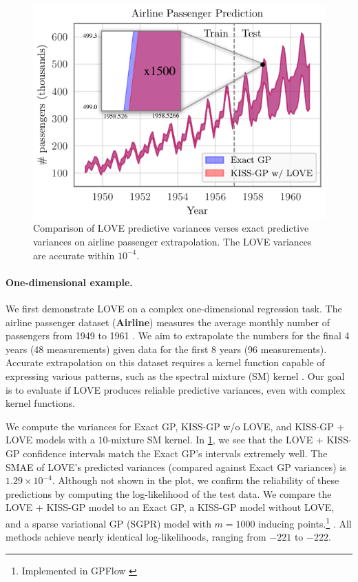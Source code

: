 \begin{figure}[t!]
  \centering
  \includegraphics[width=0.70\columnwidth]{figures/airline_comparison.pdf}
  \caption[Comparison of LOVE predictive variances verses exact predictive variances on airline passenger extrapolation.]{
    Comparison of LOVE predictive variances verses exact predictive variances on airline passenger extrapolation.
    The LOVE{} variances are accurate within $10^{-4}$.
    \label{fig:airline_results}
  }
\end{figure}

\paragraph{One-dimensional example.}
We first demonstrate LOVE{} on a complex one-dimensional regression task.
The airline passenger dataset ({\bf Airline}) measures the average monthly number of passengers from 1949 to 1961 \cite{hyndman2005time}.
We aim to extrapolate the numbers for the final 4 years (48 measurements) given data for the first 8 years (96 measurements).
Accurate extrapolation on this dataset requires a kernel function capable of expressing various patterns, such as the spectral mixture (SM) kernel \cite{wilson2013gaussian}.
Our goal is to evaluate if LOVE{} produces reliable predictive variances, even with complex kernel functions.

We compute the variances for Exact GP, KISS-GP w/o LOVE{}, and KISS-GP + LOVE{} models with a $10$-mixture SM kernel.
In \cref{fig:airline_results}, we see that the LOVE + KISS-GP{} confidence intervals match the Exact GP's intervals extremely well.
The SMAE of LOVE{}'s predicted variances (compared against Exact GP variances) is $1.29 \times 10^{-4}$.
Although not shown in the plot, we confirm the reliability of these predictions by computing the log-likelihood of the test data.
We compare the LOVE + KISS-GP{} model to an Exact GP, a KISS-GP model without LOVE{}, and a sparse variational GP (SGPR) model with $m=1000$ inducing points.\footnote{
 Implemented in GPFlow \cite{matthews2017gpflow}} \cite{titsias2009variational,hensman2013gaussian}.
All methods achieve nearly identical log-likelihoods, ranging from $-221$ to $-222$.


